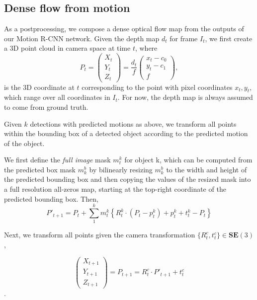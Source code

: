 \subsection{Dense flow from motion}
\label{ssec:postprocessing}
As a postprocessing, we compose a dense optical flow map from the outputs of our Motion R-CNN network.
Given the depth map $d_t$ for frame $I_t$, we first create a 3D point cloud in camera space at time $t$,
where
\begin{equation}
P_t =
\begin{pmatrix}
X_t \\ Y_t \\ Z_t
\end{pmatrix}
=
\frac{d_t}{f}
\begin{pmatrix}
x_t - c_0 \\ y_t - c_1 \\ f
\end{pmatrix},
\end{equation}
is the 3D coordinate at $t$ corresponding to the point with pixel coordinates $x_t, y_t$,
which range over all coordinates in $I_t$.
For now, the depth map is always assumed to come from ground truth.

Given $k$ detections with predicted motions as above, we transform all points within the bounding
box of a detected object according to the predicted motion of the object.

We first define the \emph{full image} mask $m_t^k$ for object k,
which can be computed from the predicted box mask $m_k^b$ by bilinearly resizing
$m_k^b$ to the width and height of the predicted bounding box and then copying the values
of the resized mask into a full resolution all-zeros map, starting at the top-right coordinate of the predicted bounding box.
Then,
\begin{equation}
P'_{t+1} =
P_t + \sum_1^{k} m_t^k\left\{ R_t^k \cdot (P_t - p_t^k) + p_t^k + t_t^k - P_t \right\}
\end{equation}

Next, we transform all points given the camera transformation $\{R_t^c, t_t^c\} \in \mathbf{SE}(3)$, %

\begin{equation}
\begin{pmatrix}
X_{t+1} \\ Y_{t+1} \\ Z_{t+1}
\end{pmatrix}
= P_{t+1} = R_t^c \cdot P'_{t+1} + t_t^c
\end{equation}.

